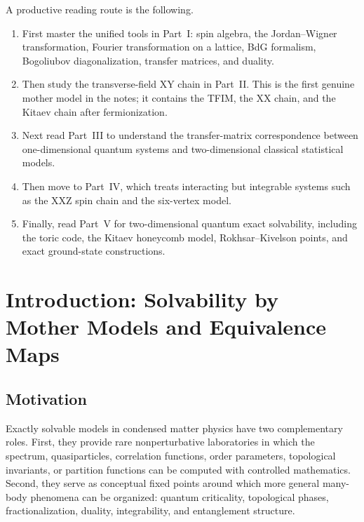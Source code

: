 \documentclass[12pt,openany]{book}
\theoremstyle{definition}
\theoremstyle{plain}
\begin{document}
A productive reading route is the following.
\begin{enumerate}[label=(\roman*)]
    \item First master the unified tools in Part~I: spin algebra, the Jordan--Wigner transformation, Fourier transformation on a lattice, BdG formalism, Bogoliubov diagonalization, transfer matrices, and duality.
    \item Then study the transverse-field XY chain in Part~II. This is the first genuine mother model in the notes; it contains the TFIM, the XX chain, and the Kitaev chain after fermionization.
    \item Next read Part~III to understand the transfer-matrix correspondence between one-dimensional quantum systems and two-dimensional classical statistical models.
    \item Then move to Part~IV, which treats interacting but integrable systems such as the XXZ spin chain and the six-vertex model.
    \item Finally, read Part~V for two-dimensional quantum exact solvability, including the toric code, the Kitaev honeycomb model, Rokhsar--Kivelson points, and exact ground-state constructions.
\end{enumerate}

\tableofcontents

\mainmatter

\chapter{Introduction: Solvability by Mother Models and Equivalence Maps}

\section{Motivation}

Exactly solvable models in condensed matter physics have two complementary roles. First, they provide rare nonperturbative laboratories in which the spectrum, quasiparticles, correlation functions, order parameters, topological invariants, or partition functions can be computed with controlled mathematics. Second, they serve as conceptual fixed points around which more general many-body phenomena can be organized: quantum criticality, topological phases, fractionalization, duality, integrability, and entanglement structure.
\end{document}

